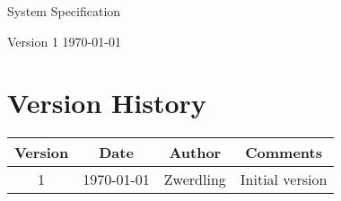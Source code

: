 \begin{titlepage}
  \begin{center}
    \LARGE
    System Specification
  \end{center}

  \vfill


  \vspace{1em}

  \large
  Version 1 \newline
  \today
  \normalsize
\end{titlepage}
\restoregeometry

\newpage



\section{Version History}
\begin{adjustbox}{width=\textwidth}
  \begin{tabular}{ |c|c|c|c| }
    \hline
    Version & Date   & Author      & Comments          \\
    \hline
    \hline
    1       & \today & {Zwerdling} & {Initial version} \\
    \hline
  \end{tabular}
\end{adjustbox}
\newpage



\tableofcontents \newpage